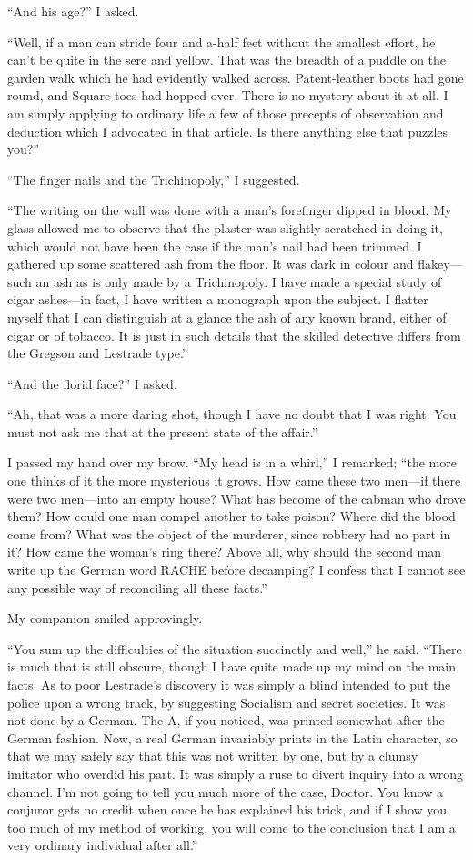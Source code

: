 \documentclass[12pt,english,oneside]{book}
\newcommand{\mdsh}[1]{\mbox{#1}\linebreak[1]}
\begin{document}
{}``And his age?'' I asked.

{}``Well, if a man can stride four and a-half feet without the smallest
effort, he can't be quite in the sere and yellow. That was the breadth
of a puddle on the garden walk which he had evidently walked across.
Patent-leather boots had gone round, and Square-toes had hopped over.
There is no mystery about it at all. I am simply applying to ordinary
life a few of those precepts of observation and deduction which I
advocated in that article. Is there anything else that puzzles you?''

{}``The finger nails and the Trichinopoly,'' I suggested.

{}``The writing on the wall was done with a man's forefinger dipped
in blood. My glass allowed me to observe that the plaster was slightly
scratched in doing it, which would not have been the case if the man's
nail had been trimmed. I gathered up some scattered ash from the floor.
It was dark in colour and flakey\mdsh{---}such an ash as is only
made by a Trichinopoly. I have made a special study of cigar ashes\mdsh{---}in
fact, I have written a monograph upon the subject. I flatter myself
that I can distinguish at a glance the ash of any known brand, either
of cigar or of tobacco. It is just in such details that the skilled
detective differs from the Gregson and Lestrade type.''

{}``And the florid face?'' I asked.

{}``Ah, that was a more daring shot, though I have no doubt that
I was right. You must not ask me that at the present state of the
affair.''

I passed my hand over my brow. {}``My head is in a whirl,'' I remarked;
{}``the more one thinks of it the more mysterious it grows. How came
these two men\mdsh{---}if there were two men\mdsh{---}into an empty
house? What has become of the cabman who drove them? How could one
man compel another to take poison? Where did the blood come from?
What was the object of the murderer, since robbery had no part in
it? How came the woman's ring there? Above all, why should the second
man write up the German word RACHE before decamping? I confess that
I cannot see any possible way of reconciling all these facts.''

My companion smiled approvingly.

{}``You sum up the difficulties of the situation succinctly and well,''
he said. {}``There is much that is still obscure, though I have quite
made up my mind on the main facts. As to poor Lestrade's discovery
it was simply a blind intended to put the police upon a wrong track,
by suggesting Socialism and secret societies. It was not done by a
German. The A, if you noticed, was printed somewhat after the German
fashion. Now, a real German invariably prints in the Latin character,
so that we may safely say that this was not written by one, but by
a clumsy imitator who overdid his part. It was simply a ruse to divert
inquiry into a wrong channel. I'm not going to tell you much more
of the case, Doctor. You know a conjuror gets no credit when once
he has explained his trick, and if I show you too much of my method
of working, you will come to the conclusion that I am a very ordinary
individual after all.''
\end{document}
